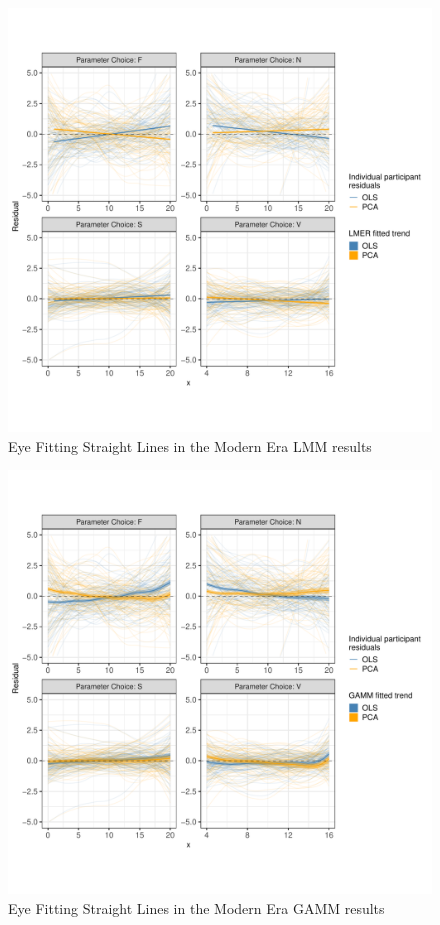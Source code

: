 \documentclass[print]{nuthesis}
\begin{document}
\begin{figure}[tbp]

{\centering \includegraphics[width=0.9\linewidth,]{thesis_files/figure-latex/eyefitting-lmer-residualplots-1} 

}

\caption{Eye Fitting Straight Lines in the Modern Era LMM results}\label{fig:eyefitting-lmer-residualplots}
\end{figure}

\begin{figure}[tbp]

{\centering \includegraphics[width=0.9\linewidth,]{thesis_files/figure-latex/eyefitting-gamm-residualplots-1} 

}

\caption{Eye Fitting Straight Lines in the Modern Era GAMM results}\label{fig:eyefitting-gamm-residualplots}
\end{figure}
\end{document}
